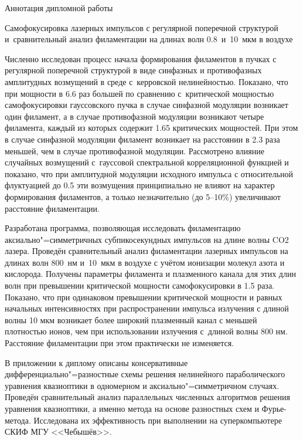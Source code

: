 \begin{center}
{\Large Аннотация дипломной работы} \\

\vspace{2ex}

{\large Самофокусировка лазерных импульсов с регулярной поперечной структурой и~сравнительный анализ филаментации на длинах волн 0.8~и~10~мкм в воздухе} \\
\end{center}

\vspace{2ex}

Численно исследован процесс начала формирования филаментов в пучках с регулярной поперечной структурой
в виде синфазных и противофазных амплитудных возмущений в среде с~керровской нелинейностью.
Показано, что при мощности в 6.6 раз большей по сравнению с~критической мощностью самофокусировки гауссовского пучка в случае синфазной модуляции возникает один филамент,
а в случае противофазной модуляции возникают четыре филамента, каждый из которых содержит 1.65 критических мощностей.
При этом в случае синфазной модуляции филамент возникает на расстоянии в 2.3 раза меньшей, чем в случае противофазной модуляции.
Рассмотрено влияние случайных возмущений с~гауссовой спектральной корреляционной функцией и показано,
что при амплитудной модуляции исходного импульса с относительной флуктуацией до 0.5 эти возмущения
принципиально не влияют на характер формирования филаментов, а только незначительно (до 5--10\%) увеличивают расстояние филаментации.

Разработана программа, позволяющая исследовать филаментацию аксиально"=симметричных субпикосекундных импульсов
на длине волны CO2 лазера. Проведён сравнительный анализ филаментации лазерных импульсов на длинах волн 800~нм и~10~мкм
в воздухе с учётом ионизации молекул азота и кислорода. Получены параметры филамента и плазменного канала для этих длин волн
при превышении критической мощности самофокусировки в 1.5 раза. Показано, что при одинаковом превышении критической мощности
и равных начальных интенсивностях при распространении импульса излучения с длиной волны 10 мкм возникает более широкий плазменный канал с меньшей плотностью ионов,
чем при использовании излучения с~длиной волны 800 нм. Расстояние филаментации при этом практически не изменяется.

В приложении к диплому описаны консервативные дифференциально"=разностные схемы решения нелинейного параболического уравнения квазиоптики
в одномерном и аксиально"=симметричном случаях. Проведён сравнительный анализ
параллельных численных алгоритмов решения уравнения квазиоптики, а именно метода на основе разностных схем и Фурье-метода.
Исследована их эффективность при выполнении на суперкомпьютере СКИФ МГУ <<Чебышёв>>.
